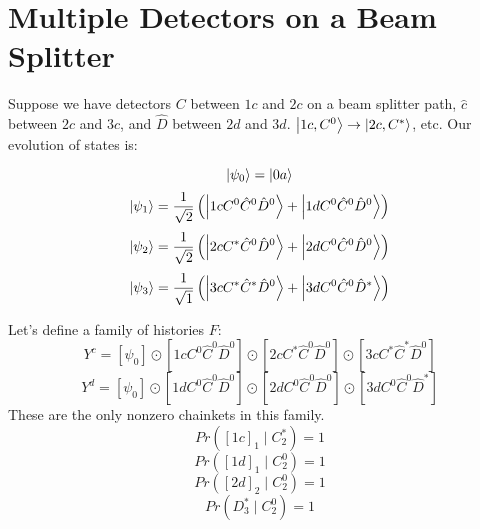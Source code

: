 \documentclass[a4paper,twoside,master.tex]{subfiles}
\begin{document}

\section{Multiple Detectors on a Beam Splitter}%
\label{sec:multiple_detectors_on_a_beam_splitter}

Suppose we have detectors $C$ between $1c$ and $2c$ on a beam splitter path, $\hat{c}$ between $2c$ and $3c$, and $\hat{D}$ between $2d$ and $3d$. $\ket{1c,C^0}\to\ket{2c,C^*}$, etc. Our evolution of states is:

\begin{equation}
    \ket{\psi_0} = \ket{0a}
\end{equation}
\begin{equation}
    \ket{\psi_1} = \frac{1}{\sqrt{2}} \left( \ket{1cC^0\hat{C}^0\hat{D}^0} + \ket{1dC^0\hat{C}^0\hat{D}^0} \right) 
\end{equation}
\begin{equation}
    \ket{\psi_2} = \frac{1}{\sqrt{2}} \left( \ket{2cC^*\hat{C}^0\hat{D}^0} + \ket{2dC^0\hat{C}^0\hat{D}^0} \right) 
\end{equation}
\begin{equation}
    \ket{\psi_3} = \frac{1}{\sqrt{1}} \left( \ket{3cC^*\hat{C}^*\hat{D}^0} + \ket{3dC^0\hat{C}^0\hat{D}^*} \right) 
\end{equation}

Let's define a family of histories $F$:
\begin{equation}
    Y^c = [\psi_0]\odot[1cC^0\hat{C}^0\hat{D}^0]\odot[2cC^*\hat{C}^0\hat{D}^0]\odot[3cC^*\hat{C}^*\hat{D}^0]
\end{equation}
\begin{equation}
    Y^d = [\psi_0]\odot[1dC^0\hat{C}^0\hat{D}^0]\odot[2dC^0\hat{C}^0\hat{D}^0]\odot[3dC^0\hat{C}^0\hat{D}^*]
\end{equation}
These are the only nonzero chainkets in this family.
\begin{equation}
    Pr([1c]_1\mid C_2^*) = 1
\end{equation}
\begin{equation}
    Pr([1d]_1\mid C_2^0) = 1
\end{equation}
\begin{equation}
    Pr([2d]_2\mid C_2^0) = 1
\end{equation}
\begin{equation}
    Pr(D_3^*\mid C_2^0) = 1
\end{equation}
\end{document}
